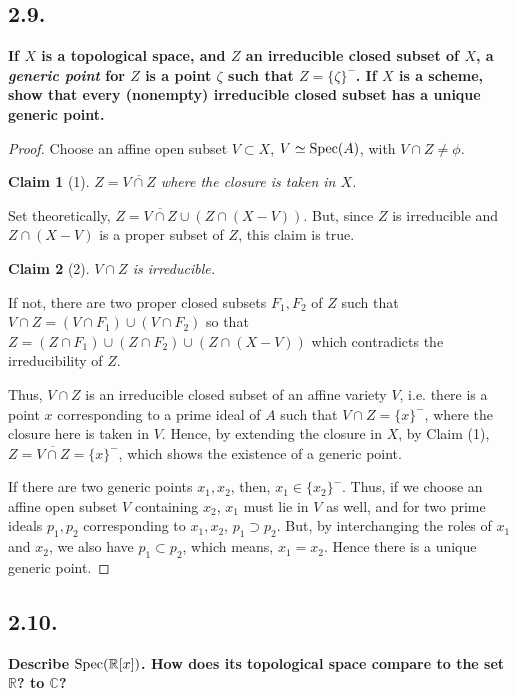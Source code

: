 \documentclass[11pt]{amsart}          %
\newcommand{\spec}{{\rm Spec}}
\newtheorem*{claim}{Claim}
\begin{document}
\subsection*{2.9.}\textbf{If $X$ is a topological space, and $Z$ an irreducible closed subset of $X$, a {\it generic point} for $Z$ is a point $\zeta$ such that $Z = \{ \zeta \} ^-$. If $X$ is a scheme, show that every (nonempty) irreducible closed subset has a unique generic point.}

\begin{proof}Choose an affine open subset $V \subset X$, $V \simeq \spec (A)$, with $V \cap Z \not = \phi$.

\begin{claim}[1] $ Z = \overline{V \cap Z}$ where the closure is taken in $X$.
\end{claim} Set theoretically, $Z = \overline{V \cap Z} \cup (Z \cap (X- V))$. But, since $Z$ is irreducible and $Z \cap (X-V)$ is a proper subset of $Z$, this claim is true.

\begin{claim}[2] $V \cap Z$ is irreducible. \end{claim} If not, there are two proper closed subsets $F_1, F_2$ of $Z$ such that $V \cap Z = (V \cap F_1) \cup (V \cap F_2)$ so that $Z = (Z \cap F_1) \cup (Z \cap F_2) \cup (Z \cap (X- V))$ which contradicts the irreducibility of $Z$.

\vskip0.2cm

Thus, $V\cap Z$ is an irreducible closed subset of an affine variety $V$, i.e. there is a point $x$ corresponding to a prime ideal of $A$ such that $V \cap Z = \{ x \} ^-$, where the closure here is taken in $V$. Hence, by extending the closure in $X$, by Claim (1), $Z = \overline{V \cap Z} = \{ x \} ^-$, which shows the existence of a generic point.

If there are two generic points $x_1, x_2$, then, $x_1 \in \{ x_2 \}^-$. Thus, if we choose an affine open subset $V$ containing $x_2$, $x_1$ must lie in $V$ as well, and for two prime ideals $p_1, p_2$ corresponding to $x_1, x_2$, $p_1 \supset p_2$. But, by interchanging the roles of $x_1$ and $x_2$, we also have $p_1 \subset p_2$, which means, $x_1 = x_2$. Hence there is a unique generic point.\end{proof}

\subsection*{2.10.} \textbf{Describe $\spec (\mathbb{R} [x] )$. How does its topological space compare to the set $\mathbb{R}$? to $\mathbb{C}$?}
\end{document}

